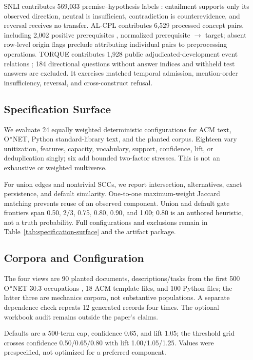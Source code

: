\documentclass[manuscript,screen,review,anonymous]{acmart}
\begin{document}
SNLI contributes 569,033 premise--hypothesis labels \cite{bowman2015}: entailment supports only its observed direction, neutral is insufficient, contradiction is counterevidence, and reversal receives no transfer. AL-CPL contributes 6,529 processed concept pairs, including 2,002 positive prerequisites \cite{liang2018,wang2016}, normalized prerequisite $\rightarrow$ target; absent row-level origin flags preclude attributing individual pairs to preprocessing operations. TORQUE contributes 1,928 public adjudicated-development event relations \cite{ning2020}; 184 directional questions without answer indices and withheld test answers are excluded. It exercises matched temporal admission, mention-order insufficiency, reversal, and cross-construct refusal.

\subsection{Specification Surface}

We evaluate 24 equally weighted deterministic configurations for ACM text, O*NET, Python standard-library text, and the planted corpus. Eighteen vary unitization, features, capacity, vocabulary, support, confidence, lift, or deduplication singly; six add bounded two-factor stresses. This is not an exhaustive or weighted multiverse.

For union edges and nontrivial SCCs, we report intersection, alternatives, exact persistence, and default similarity. One-to-one maximum-weight Jaccard matching prevents reuse of an observed component. Union and default gate frontiers span 0.50, $2/3$, 0.75, 0.80, 0.90, and 1.00; 0.80 is an authored heuristic, not a truth probability. Full configurations and exclusions remain in Table~\ref{tab:specification-surface} and the artifact package.

\subsection{Corpora and Configuration}

The four views are 90 planted documents, descriptions/tasks from the first 500 O*NET 30.3 occupations \cite{onet303}, 18 ACM template files, and 100 Python files; the latter three are mechanics corpora, not substantive populations. A separate dependence check repeats 12 generated records four times. The optional workbook audit remains outside the paper's claims.

Defaults are a 500-term cap, confidence 0.65, and lift 1.05; the threshold grid crosses confidence 0.50/0.65/0.80 with lift 1.00/1.05/1.25. Values were prespecified, not optimized for a preferred component.
\end{document}
